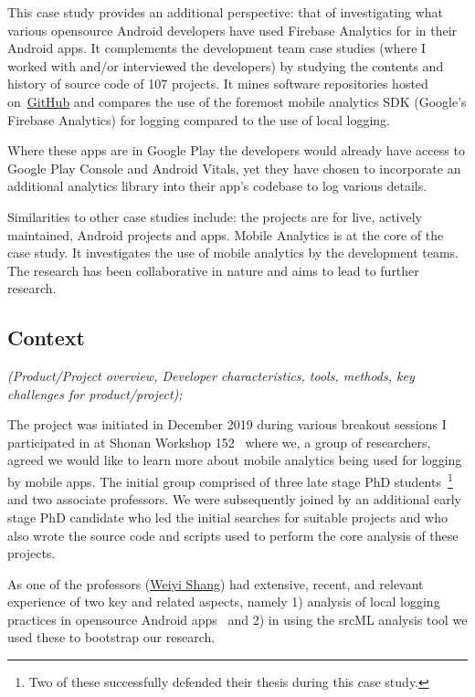 This case study provides an additional perspective: that of investigating what various opensource Android developers have used Firebase Analytics for in their Android apps. It complements the development team case studies (where I worked with and/or interviewed the developers) by studying the contents and history of source code of 107 projects. It mines software repositories hosted on~\href{https://github.com/}{GitHub} and compares the use of the foremost mobile analytics SDK (Google's Firebase Analytics) for logging compared to the use of local logging.

Where these apps are in Google Play the developers would already have access to Google Play Console and Android Vitals, yet they have chosen to incorporate an additional analytics library into their app's codebase to log various details. 

Similarities to other case studies include: the projects are for live, actively maintained, Android projects and apps. Mobile Analytics is at the core of the case study. It investigates the use of mobile analytics by the development teams. The research has been collaborative in nature and aims to lead to further research.


\subsection{Context}
\emph{(Product/Project overview, Developer characteristics, tools, methods, key challenges for product/project);}

The project was initiated in December 2019 during various breakout sessions I participated in at Shonan Workshop 152~\citep{nii_shonan_workshop_152} where we, a group of researchers, agreed we would like to learn more about mobile analytics being used for logging by mobile apps. The initial group comprised of three late stage PhD students~\footnote{Two of these successfully defended their thesis during this case study.} and two associate professors. We were subsequently joined by an additional early stage PhD candidate who led the initial searches for suitable projects and who also wrote the source code and scripts used to perform the core analysis of these projects.

As one of the professors (\href{https://users.encs.concordia.ca/~shang/}{Weiyi Shang}) had extensive, recent, and relevant experience of two key and related aspects, namely 1) analysis of local logging practices in opensource Android apps~\citep{zeng2019studying_logging_practices_fdroid} and 2) in using the srcML analysis tool we used these to bootstrap our research.

